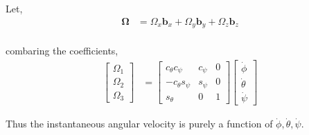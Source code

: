 Let,
\begin{align*}
    \pmb \Omega &= \Omega_x \pmb b_x + \Omega_y \pmb b_y + \Omega_z \pmb b_z\\
\end{align*}

combaring the coefficients,
\begin{align*}
    \begin{bmatrix}
        \Omega_1 \\ \Omega_2 \\ \Omega_3
    \end{bmatrix}
    &=
    \begin{bmatrix}
        c_{\theta}c_{\psi} &  c_{\psi} & 0\\
        -c_{\theta}s_{\psi} & s_{\psi} & 0\\
        s_{\theta} & 0 & 1
    \end{bmatrix}
    \begin{bmatrix}
        \dot \phi \\ \dot \theta \\ \dot \psi
    \end{bmatrix}
\end{align*}

Thus the instantaneous angular velocity is purely a function of $\dot \phi , \dot \theta , \dot \psi $.
